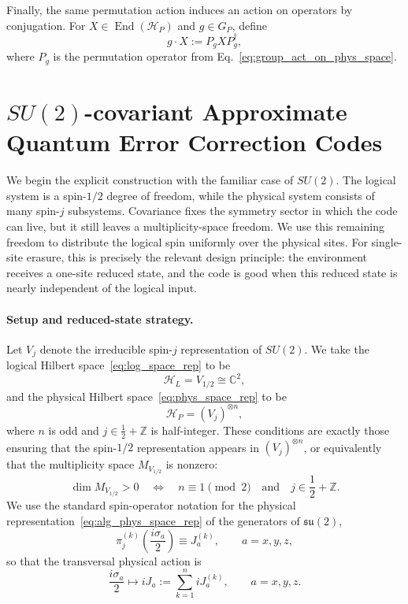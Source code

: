 \documentclass[10pt,twocolumn,superscriptaddress,aps,amsmath,amssymb,citeautoscript,floatfix,prx,longbibliography]{revtex4-2}
\newcounter{alg}
\theoremstyle{plain}
\theoremstyle{plain}
\theoremstyle{plain}
\theoremstyle{plain}
\theoremstyle{plain}
\theoremstyle{plain}
\begin{document}
Finally, the same permutation action induces an action on operators by conjugation. For $X\in\operatorname{End}(\mathcal H_P)$ and $g\in G_P$, define
\begin{equation}\label{eq:group_act_oper}
g\cdot X
:=
P_gXP_g^\dagger,
\end{equation}
where $P_g$ is the permutation operator from Eq.~\eqref{eq:group_act_on_phys_space}.

\color{black}


\section{\texorpdfstring{$SU(2)$}{SU(2)}-covariant Approximate Quantum Error Correction Codes}\label{sec:main_su2}

We begin the explicit construction with the familiar case of $SU(2)$. The logical system is a spin-$1/2$ degree of freedom, while the physical system consists of many spin-$j$ subsystems. Covariance fixes the symmetry sector in which the code can live, but it still leaves a multiplicity-space freedom. We use this remaining freedom to distribute the logical spin uniformly over the physical sites. For single-site erasure, this is precisely the relevant design principle: the environment receives a one-site reduced state, and the code is good when this reduced state is nearly independent of the logical input.

\paragraph{Setup and reduced-state strategy.}

Let $V_j$ denote the irreducible spin-$j$ representation of $SU(2)$. We take the logical Hilbert space~\eqref{eq:log_space_rep} to be
\[
    \mathcal H_L = V_{1/2}\cong \mathbb C^2,
\]
and the physical Hilbert space~\eqref{eq:phys_space_rep} to be
\[
    \mathcal H_P = (V_j)^{\otimes n},
\]
where $n$ is odd and $j\in \frac12+\mathbb Z$ is half-integer. These conditions are exactly those ensuring that the spin-$1/2$ representation appears in $(V_j)^{\otimes n}$, or equivalently that the multiplicity space $M_{V_{1/2}}$ is nonzero:
\[
    \dim M_{V_{1/2}}>0
    \quad\Longleftrightarrow\quad
    n\equiv 1 \pmod 2
    \quad\text{and}\quad
    j\in \frac12+\mathbb Z .
\]
We use the standard spin-operator notation for the physical representation~\eqref{eq:alg_phys_space_rep} of the generators of $\mathfrak{su}(2)$,
\[
    \pi_j^{(k)}\left(\frac{i\sigma_a}{2}\right)
    \equiv J_a^{(k)},
    \qquad a=x,y,z,
\]
so that the transversal physical action is
\begin{equation}\label{eq:su2_cov_rep}
    \frac{i\sigma_a}{2}
    \longmapsto
    iJ_a
    :=
    \sum_{k=1}^n iJ_a^{(k)},
    \qquad a=x,y,z .
\end{equation}
\end{document}
